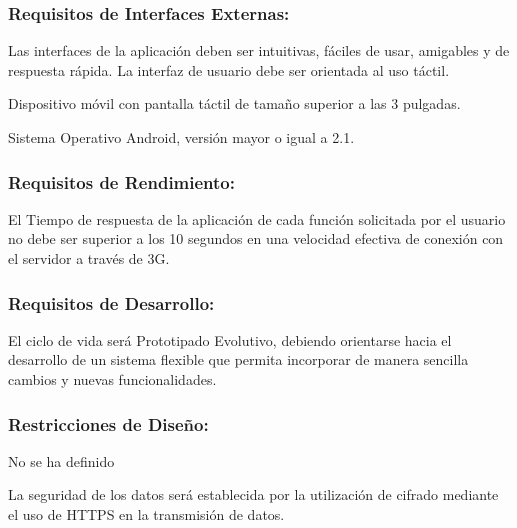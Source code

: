         \subsubsection{Requisitos de Interfaces Externas:}
        
            
            Las interfaces de la aplicación deben ser intuitivas, fáciles de usar, amigables y de respuesta rápida. La interfaz de usuario debe ser orientada al uso táctil.
            
            
            Dispositivo móvil con pantalla táctil de tamaño superior a las 3 pulgadas.
            
            
            Sistema Operativo Android, versión mayor o igual a 2.1.
            
        \subsubsection{Requisitos de Rendimiento:}
        
        El Tiempo de respuesta de la aplicación de cada función solicitada por el usuario no debe ser superior a los  10 segundos en una velocidad efectiva de conexión con el servidor a través de 3G.
        
        \subsubsection{Requisitos de Desarrollo:}
        
        El ciclo de vida será Prototipado Evolutivo, debiendo orientarse hacia el desarrollo de un sistema flexible que permita incorporar de manera sencilla cambios y nuevas funcionalidades.
        
       \subsubsection{Restricciones de Diseño:}
       
         No se ha definido
        
        
        La seguridad de los datos será establecida por la utilización de cifrado mediante el uso de HTTPS en la transmisión de datos.
        
